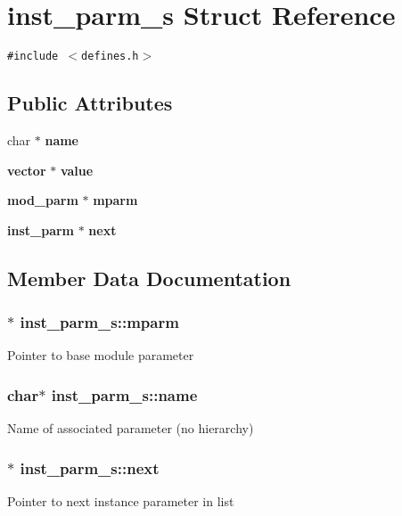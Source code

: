 \section{inst\_\-parm\_\-s  Struct Reference}
\label{structinst__parm__s}
{\tt \#include $<$defines.h$>$}

\subsection*{Public Attributes}
\begin{CompactItemize}
\item 
char $\ast$ {\bf name}
\item 
{\bf vector} $\ast$ {\bf value}
\item 
{\bf mod\_\-parm} $\ast$ {\bf mparm}
\item 
{\bf inst\_\-parm} $\ast$ {\bf next}
\end{CompactItemize}


\subsection{Member Data Documentation}
\subsubsection{$\ast$ inst\_\-parm\_\-s::mparm}\label{structinst__parm__s_m2}


Pointer to base module parameter 
\subsubsection{\setlength{\rightskip}{0pt plus 5cm}char$\ast$ inst\_\-parm\_\-s::name}\label{structinst__parm__s_m0}


Name of associated parameter (no hierarchy) 
\subsubsection{$\ast$ inst\_\-parm\_\-s::next}\label{structinst__parm__s_m3}


Pointer to next instance parameter in list 
